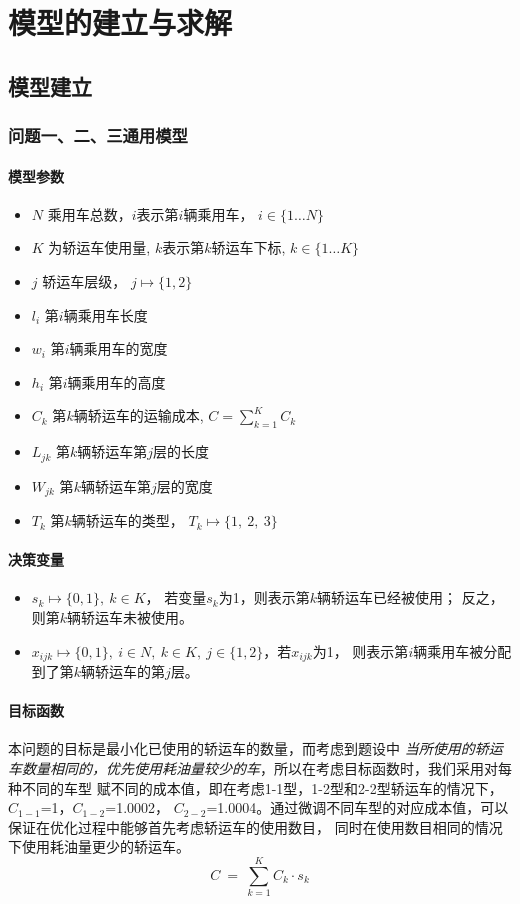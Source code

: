 \documentclass[UTF8，12pt]{ctexart}
\begin{document}
\section{模型的建立与求解}
\subsection{模型建立}
\subsubsection{问题一、二、三通用模型}
\label{sec:q123_model}

\paragraph{模型参数}
	\begin{itemize}
			\item $N$ 乘用车总数，$i$表示第$i$辆乘用车， $i \in \{1 \dots N\}$
			\item $K$ 为轿运车使用量, $k$表示第$k$轿运车下标,  $k \in \{1 \dots K\}$
			\item $j$ 轿运车层级， $j \mapsto \{1,2\}$
			\item $l_i$ 第$i$辆乘用车长度
			\item $w_i$ 第$i$辆乘用车的宽度
			\item $h_i$ 第$i$辆乘用车的高度
			\item $C_k$ 第$k$辆轿运车的运输成本, $C=\sum_{k=1}^{K}C_k$
			\item $L_{jk}$ 第$k$辆轿运车第$j$层的长度
			\item $W_{jk}$ 第$k$辆轿运车第$j$层的宽度
			\item $T_k$ 第$k$辆轿运车的类型， $T_k \mapsto \{1, ~2, ~3\}$	
		\end{itemize}
\paragraph{决策变量}
\label{sec:model1_devar}
\begin{itemize}
	\item $s_k \mapsto \{0,1\}, ~ k \in K$， 若变量$s_k$为1，则表示第$k$辆轿运车已经被使用；
	反之，则第$k$辆轿运车未被使用。
	\item $x_{ijk}\mapsto \{0,1\}, ~ i\in N,~ k \in K,~ j\in \{1,2\}$，若$x_{ijk}$为1，
	则表示第$i$辆乘用车被分配到了第$k$辆轿运车的第$j$层。
\end{itemize}

\paragraph{目标函数}
	本问题的目标是最小化已使用的轿运车的数量，而考虑到题设中
	\textit{当所使用的轿运车数量相同的，优先使用耗油量较少的车}，所以在考虑目标函数时，我们采用对每种不同的车型
	赋不同的成本值，即在考虑1-1型，1-2型和2-2型轿运车的情况下，$C_{1-1}$=1，$C_{1-2}$=1.0002，
	$C_{2-2}$=1.0004。通过微调不同车型的对应成本值，可以保证在优化过程中能够首先考虑轿运车的使用数目，
	同时在使用数目相同的情况下使用耗油量更少的轿运车。
	\begin{equation}
		C \ = \ \sum_{k=1}^{K}C_k \cdot s_k
	\end{equation}
\end{document}
